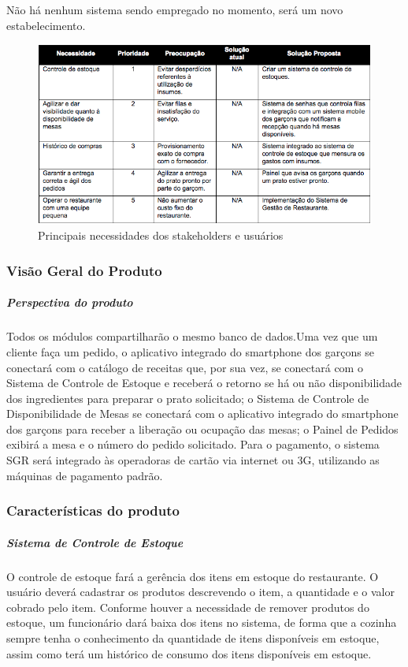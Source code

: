 Não há nenhum sistema sendo empregado no momento, será um novo estabelecimento.

\begin{figure}[H]
  \centering
  \includegraphics[width=1\textwidth]{softwareengineer/images/stakerholdersneed} 
  \caption{Principais necessidades dos stakeholders e usuários}
  \label{fig:stakerholdersneed} 
\end{figure}

\subsubsection{Visão Geral do Produto}

\subparagraph{Perspectiva do produto}

Todos os módulos compartilharão o mesmo banco de dados.Uma vez que um cliente faça um pedido, o aplicativo integrado do smartphone dos garçons se conectará com o catálogo de receitas que, por sua vez, se conectará com o Sistema de Controle de Estoque e receberá o retorno se há ou não disponibilidade dos ingredientes para preparar o prato solicitado; o Sistema de Controle de Disponibilidade de Mesas se conectará com o aplicativo integrado do smartphone dos garçons para receber a liberação ou ocupação das mesas; o Painel de Pedidos exibirá a mesa e o número do pedido solicitado. Para o pagamento, o sistema SGR será integrado às operadoras de cartão via internet ou 3G, utilizando as máquinas de pagamento padrão.

\subsubsection{Características do produto}

\subparagraph{Sistema de Controle de Estoque}

O controle de estoque fará a gerência dos itens em estoque do restaurante. O usuário deverá cadastrar os produtos descrevendo o item, a quantidade e o valor cobrado pelo item. Conforme houver a necessidade de remover produtos do estoque, um funcionário dará baixa dos itens no sistema, de forma que a cozinha sempre tenha o conhecimento da quantidade de itens disponíveis em estoque, assim como terá um histórico de consumo dos itens disponíveis em estoque.

